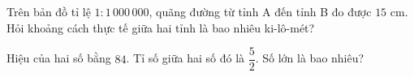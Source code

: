 \begin{ex} %
Trên bản đồ tỉ lệ $1 : 1\,000\,000$, quãng đường từ tỉnh A đến tỉnh B đo được $15\text{ cm}$. Hỏi khoảng cách thực tế giữa hai tỉnh là bao nhiêu ki-lô-mét?
\end{ex}

\begin{ex} %
Hiệu của hai số bằng $84$. Tỉ số giữa hai số đó là $\dfrac{5}{2}$. Số lớn là bao nhiêu?
\end{ex}
